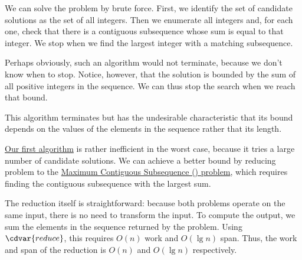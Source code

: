 \begin{algorithm}
\label{alg:mcss::bf-alg::brutest}

We can solve the \MCSS{} problem by brute force.
%
First, we identify the set of candidate solutions as the set of all
integers.
%
Then we enumerate all integers and, for each one, check that there is
a contiguous subsequence whose sum is equal to that integer.
%
We stop when we find the largest integer with a matching subsequence.
%


Perhaps obviously, such an algorithm would not terminate, because we
don't know when to stop.
%
Notice, however, that the solution is bounded by the sum of all
positive integers in the sequence.
%
We can thus stop the search when we reach that bound.
%

This algorithm terminates but has the undesirable characteristic that
its bound depends on the values of the elements in the sequence rather
that its length.
\end{algorithm}

\begin{gram}
\href{alg:mcss::bf-alg::brutest}{Our first algorithm} is rather
inefficient in the worst case, because it tries a large number of
candidate solutions.
%
We can achieve a better bound by reducing \MCSS{} problem to the
\href{def:mcss::introduction::mcss-problem}{Maximum Contiguous Subsequence (\MCS{}) problem}, which requires finding the contiguous subsequence with the
largest sum.
%

The reduction itself is straightforward: because both problems operate
on the same input, there is no need to transform the input.
%
To compute the output, we sum the elements in the sequence returned by
the \MCS{} problem.
%
Using $\cdvar{reduce}$, this requires $O(n)$ work and $O(\lg{n})$ span.
%
Thus, the work and span of the reduction is $O(n)$ and $O(\lg{n})$
respectively.
\end{gram}

